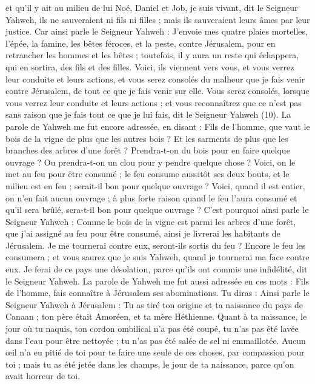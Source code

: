 \begin{multicols}{2}
et qu’il y ait au milieu de lui Noé\FTNT{}, Daniel\FTNT{} et Job\FTNT{}, je suis vivant, dit le Seigneur Yahweh, ils ne sauveraient ni fils ni filles ; mais ils sauveraient leurs âmes par leur justice.
Car ainsi parle le Seigneur Yahweh : J'envoie mes quatre plaies mortelles, l'épée, la famine, les bêtes féroces, et la peste, contre Jérusalem, pour en retrancher les hommes et les bêtes\FTNT{} ;
toutefois, il y aura un reste qui échappera, qui en sortira, des fils et des filles. Voici, ils viennent vers vous, et vous verrez leur conduite et leurs actions, et vous serez consolés du malheur que je fais venir contre Jérusalem, de tout ce que je fais venir sur elle.
Vous serez consolés, lorsque vous verrez leur conduite et leurs actions ; et vous reconnaîtrez que ce n’est pas sans raison que je fais tout ce que je lui fais, dit le Seigneur Yahweh (10).
\VerseOne{}La parole de Yahweh me fut encore adressée, en disant :
Fils de l’homme, que vaut le bois de la vigne de plus que les autres bois ? Et les sarments  de plus que les branches des arbres d'une forêt ?
Prendra-t-on du bois pour en faire quelque ouvrage ? Ou prendra-t-on un clou pour y pendre quelque chose ?
Voici, on le met au feu pour être consumé ; le feu consume aussitôt ses deux bouts, et le milieu est en feu ; serait-il bon pour quelque ouvrage ?
Voici, quand il est entier, on n'en fait aucun ouvrage ; à plus forte raison quand le feu l'aura consumé et qu'il sera brûlé, sera-t-il bon pour quelque ouvrage ?
C'est pourquoi ainsi parle le Seigneur Yahweh : Comme le bois de la vigne est parmi les arbres d'une forêt, que j'ai assigné au feu pour être consumé, ainsi je livrerai les habitants de Jérusalem.
Je me tournerai contre eux, seront-ils sortis du feu ? Encore le feu les consumera ; et vous saurez que je suis Yahweh, quand je tournerai ma face contre eux.
Je ferai de ce pays une désolation, parce qu'ils ont commis une infidélité, dit le Seigneur Yahweh.
\VerseOne{}La parole de Yahweh me fut aussi adressée en ces mots :
Fils de l’homme, fais connaître à Jérusalem ses abominations.
Tu diras : Ainsi parle le Seigneur Yahweh à Jérusalem : Tu as tiré ton origine et ta naissance du pays de Canaan ; ton père était Amoréen, et ta mère Héthienne.
Quant à ta naissance, le jour où tu naquis, ton cordon ombilical n’a pas été coupé, tu n’as pas été lavée dans l'eau pour être nettoyée ; tu n’as pas été salée de sel ni emmaillotée.
Aucun œil  n’a eu pitié de toi pour te faire une seule de ces choses, par compassion pour toi ; mais tu as été jetée dans les champs, le jour de ta naissance, parce qu'on avait horreur de toi.

\end{multicols}
